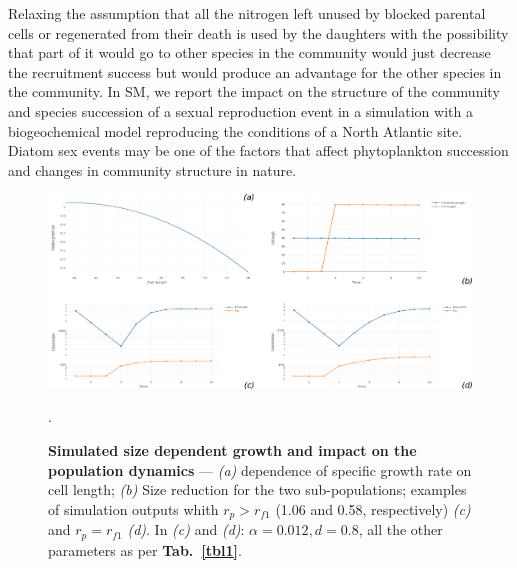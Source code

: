 \documentclass[a4paper,oneside]{article}
\begin{document}
    Relaxing the assumption that all the nitrogen left unused by blocked parental cells or regenerated from their death is used by the daughters with the possibility that part of it would go to other species in the community would just decrease the recruitment success but would produce an advantage for the other species in the community.
    In SM, we report the impact on the structure of the community and species succession of a sexual reproduction event in a simulation with a biogeochemical model reproducing the conditions of a North Atlantic site.
    Diatom sex events may be one of the factors that affect phytoplankton succession and changes in community structure in nature.
    \begin{figure}[p]
      \includegraphics[width=\linewidth]{imgs/Figpan.pdf}
      \caption{\textbf{Simulated size dependent growth and impact on the population dynamics} ---
        {\color{blue}\textit{(a)}} dependence of specific growth rate on cell length;
        {\color{blue}\textit{(b)}} Size reduction for the two sub-populations;
        examples of simulation outputs whith $r_{p} >r_{f1}$ (1.06 and 0.58, respectively) {\color{blue}\textit{(c)}} and $r_{p} = r_{f1}$ {\color{blue}\textit{(d)}}.
        In {\color{blue}\textit{(c)}} and {\color{blue}\textit{(d)}}: $\alpha=0.012, d = 0.8$, all the other parameters as per \textbf{Tab.~\ref{tbl1}}.
      }\label{fdyn}.
    \end{figure}
\end{document}
